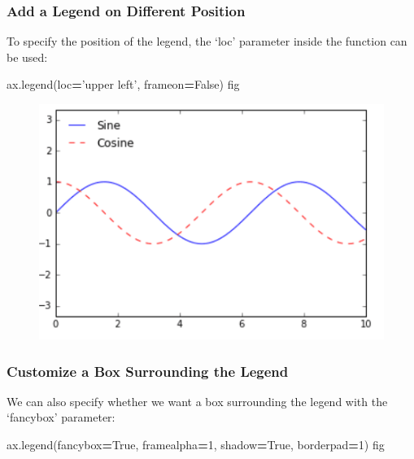 \documentclass[]{book}
\newenvironment{Shaded}{\begin{snugshade}}{\end{snugshade}}
\newcommand{\DecValTok}[1]{\textcolor[rgb]{0.00,0.00,0.81}{#1}}
\newcommand{\StringTok}[1]{\textcolor[rgb]{0.31,0.60,0.02}{#1}}
\newcommand{\VariableTok}[1]{\textcolor[rgb]{0.00,0.00,0.00}{#1}}
\newcommand{\OperatorTok}[1]{\textcolor[rgb]{0.81,0.36,0.00}{\textbf{#1}}}
\newcommand{\NormalTok}[1]{#1}
\begin{document}
\subsubsection{Add a Legend on Different
Position}\label{add-a-legend-on-different-position}

To specify the position of the legend, the `loc' parameter inside the
function can be used:

\begin{Shaded}
\begin{Highlighting}[]
\NormalTok{ax.legend(loc}\OperatorTok{=}\StringTok{'upper left'}\NormalTok{, frameon}\OperatorTok{=}\VariableTok{False}\NormalTok{)}
\NormalTok{fig}
\end{Highlighting}
\end{Shaded}

\begin{figure}
\centering
\includegraphics{images/legend2.png}
\caption{}
\end{figure}

\subsubsection{Customize a Box Surrounding the
Legend}\label{customize-a-box-surrounding-the-legend}

We can also specify whether we want a box surrounding the legend with
the `fancybox' parameter:

\begin{Shaded}
\begin{Highlighting}[]
\NormalTok{ax.legend(fancybox}\OperatorTok{=}\VariableTok{True}\NormalTok{, framealpha}\OperatorTok{=}\DecValTok{1}\NormalTok{, shadow}\OperatorTok{=}\VariableTok{True}\NormalTok{, borderpad}\OperatorTok{=}\DecValTok{1}\NormalTok{)}
\NormalTok{fig}
\end{Highlighting}
\end{Shaded}
\end{document}
